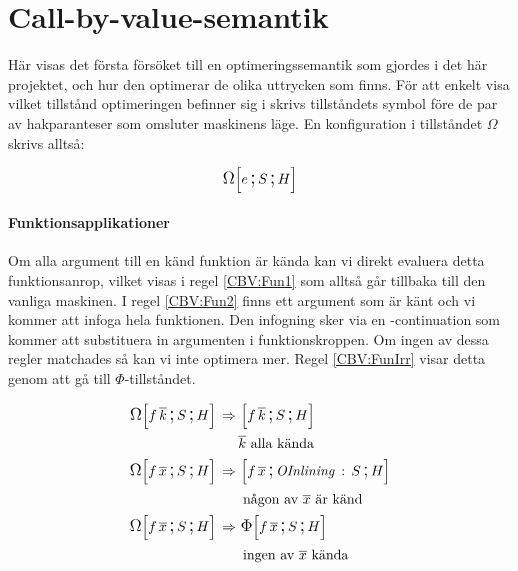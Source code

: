 \documentclass[../Optimise]{subfiles}
\begin{document}

\section{Call-by-value-semantik}
\label{sec:Optimise:CBV}

Här visas det första försöket till en optimeringssemantik som gjordes i det
här projektet, och hur den optimerar de olika uttrycken som finns. 
För att enkelt visa vilket tillstånd optimeringen befinner sig i skrivs tillståndets symbol
före de par av hakparanteser som omsluter maskinens läge. 
En konfiguration i tillståndet $\Omega$ skrivs alltså:

\[
\OMEGA SHe
\]




\paragraph{Funktionsapplikationer}
Om alla argument till en känd funktion är kända kan vi direkt evaluera detta funktionsanrop,
vilket visas i regel \eqref{CBV:Fun1} som alltså går tillbaka till den vanliga maskinen. 
I regel \eqref{CBV:Fun2} finns ett argument som
är känt och vi kommer att infoga hela funktionen. Den infogning sker via en -continuation
som kommer att substituera in argumenten i funktionskroppen. Om ingen av dessa regler
matchades så kan vi inte optimera mer. Regel \eqref{CBV:FunIrr} visar detta genom
att gå till $\Phi$-tillståndet.

\begin{comment}
\begin{align}
\label{CBV:Fun1} \OMEGA SH{f\,\many{k}}  \rulesep &\, \mc{f\,\many{k}}SH\\
 & \many{k} \text{ alla kända} \nonumber \\
\label{CBV:Fun2} \OMEGA SH{f\,\many{x}\, k\,\many{y}}  \rulesep &\, \mc{f\,\many{x}\, k\,\many{y}}{\oInline S}H\\
 & \many{x},\many{y} \text{ okänd, } k \text{ är känd} \nonumber \\
\label{CBV:FunIrr} \OMEGA SH{f\,\many{x}} \rulesep &\, \IRR SH{f\,\many{x}}
\end{align}
\end{comment}

\begin{align}
\label{CBV:Fun1} \OMEGA SH{f\,\many{k}}  \rulesep &\, \mc{f\,\many{k}}SH\\
 & \many{k} \text{ alla kända} \nonumber \\
\label{CBV:Fun2} \OMEGA SH{f\,\many{x}}  \rulesep &\, \mc{f\,\many{x}}{\oInline S}H\\
 & \text{ någon av } \many{x} \text{ är känd} \nonumber \\
\label{CBV:FunIrr} \OMEGA SH{f\,\many{x}} \rulesep &\, \IRR SH{f\,\many{x}} \\
 & \text{ ingen av } \many{x} \text{ kända} \nonumber
\end{align}
\end{document}
